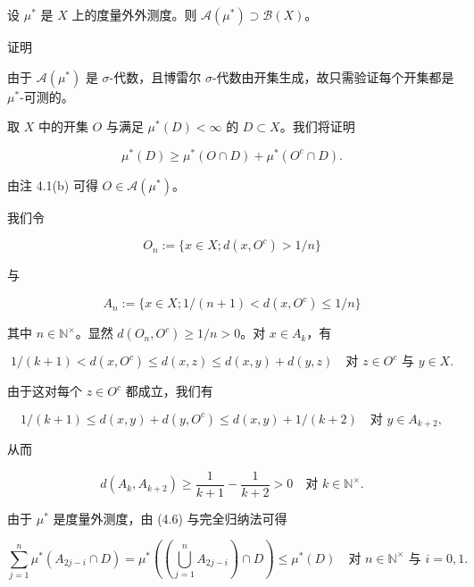 \begin{theorem}

设 $ \mu^* $ 是 $ X $ 上的度量外外测度。则 $ \mathcal{A}(\mu^*) \supset \mathcal{B}(X) $。

证明

\begin{subitems}
\item

由于 $ \mathcal{A}(\mu^*) $ 是 $ \sigma $-代数，且博雷尔 $ \sigma $-代数由开集生成，故只需验证每个开集都是 $ \mu^* $-可测的。

\item

取 $ X $ 中的开集 $ O $ 与满足 $ \mu^*(D) < \infty $ 的 $ D \subset X $。我们将证明

\[
\mu^*(D) \ge \mu^*(O \cap D) + \mu^*(O^c \cap D) .
\]

由注 4.1(b) 可得 $ O \in \mathcal{A}(\mu^*) $。

\end{subitems}


我们令

\[
O_n := \{ x \in X ; d(x, O^c) > 1/n \}
\]

与

\[
A_n := \{ x \in X ; 1/(n+1) < d(x, O^c) \le 1/n \}
\]

其中 $ n \in \mathbb{N}^{\times} $。显然 $ d(O_n, O^c) \ge 1/n > 0 $。对 $ x \in A_k $，有

\[
1/(k+1) < d(x, O^c) \le d(x, z) \le d(x, y) + d(y, z) \quad\text{对 } z \in O^c \text{ 与 } y \in X .
\]

由于这对每个 $ z \in O^c $ 都成立，我们有

\[
1/(k+1) \le d(x, y) + d(y, O^c) \le d(x, y) + 1/(k+2) \quad\text{对 } y \in A_{k+2} ,
\]

从而

\begin{equation}
d(A_k, A_{k+2}) \ge \frac{1}{k+1} - \frac{1}{k+2} > 0 \quad\text{对 } k \in \mathbb{N}^{\times} .\tag{4.6}
\end{equation}

\begin{subitems}
\item[（iii）]

由于 $ \mu^* $ 是度量外测度，由 (4.6) 与完全归纳法可得

\[
\sum_{j=1}^{n} \mu^*(A_{2j-i} \cap D) = \mu^*\left(\left(\bigcup_{j=1}^{n} A_{2j-i}\right) \cap D\right) \le \mu^*(D) \quad\text{对 } n \in \mathbb{N}^{\times} \text{ 与 } i = 0, 1 .
\]


\end{subitems}
\end{theorem}
